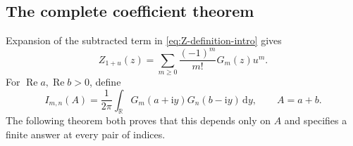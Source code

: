 \documentclass[11pt,a4paper]{article}
\theoremstyle{definition}
\numberwithin{equation}{section}
\newcommand{\R}{\mathbb R}
\newcommand{\Rea}{\operatorname{Re}}
\newcommand{\dd}{\,\mathrm d}
\newcommand{\ii}{\mathrm i}
\begin{document}
\subsection{The complete coefficient theorem}
Expansion of the subtracted term in \eqref{eq:Z-definition-intro} gives
\begin{equation}\label{eq:Z-G-expansion}
 Z_{1+u}(z)=\sum_{m\ge0}\frac{(-1)^m}{m!}G_m(z)u^m.
\end{equation}
For $\Rea a,\Rea b>0$, define
\begin{equation}\label{eq:Imn}
 I_{m,n}(A)=\frac1{2\pi}\int_{\R}
            G_m(a+\ii y)G_n(b-\ii y)\dd y,
 \qquad A=a+b.
\end{equation}
The following theorem both proves that this depends only on $A$ and
specifies a finite answer at every pair of indices.
\end{document}
